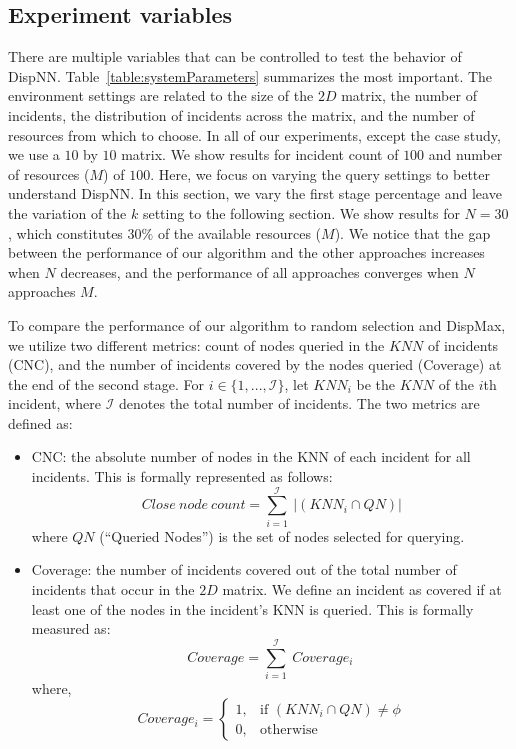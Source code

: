 \documentclass{acm_proc_article-sp}
\begin{document}
\subsection{Experiment variables}
There are multiple variables that can be controlled to test the behavior of DispNN. Table~\ref{table:systemParameters} summarizes the most important.
The environment settings are related to the size of the $2D$ matrix, the number of incidents, the distribution of incidents across the matrix, and the number of resources from which to choose. In all of our experiments, except the case study, we use a $10$ by $10$ matrix. We show results for incident count of $100$ and number of resources ($M$) of $100$. Here, we focus on varying the query settings to better understand DispNN. In this section, we vary the first stage percentage and leave the variation of the $k$ setting to the following section. We show results for $N = 30$, which constitutes $30\%$ of the available resources ($M$). We notice that the gap between the performance of our algorithm and the other approaches increases when $N$ decreases, and the performance of all approaches converges when $N$ approaches $M$. \par

To compare the performance of our algorithm to random selection and DispMax, we utilize two different metrics: count of nodes queried in the $KNN$ of incidents (CNC), and the number of incidents covered by the nodes queried (Coverage) at the end of the second stage. For $i \in \{1, ...,\mathcal{I}\}$, let $KNN_i$ be the $KNN$ of the $i$th incident, where $\mathcal{I}$ denotes the total number of incidents. The two metrics are defined as:
\begin{itemize}
\item CNC: the absolute number of nodes in the KNN of each incident for all incidents. This is formally represented as follows:
\begin{equation}
Close\ node\ count = \sum\limits_{ i = 1}^\mathcal{I}\ |(KNN_i \cap {QN})|
\end{equation}
where $QN$ (``Queried Nodes'') is the set of nodes selected for querying.
\item Coverage: the number of incidents covered out of the total number of incidents that occur in the $2D$ matrix. We define an incident as covered if at least one of the nodes in the incident's KNN is queried. This is formally measured as:
\begin{equation}
Coverage =  \sum\limits_{ i = 1}^\mathcal{I}\ Coverage_i\ 
\end{equation}
where,
\[
Coverage_i =
\begin{cases}
1,& \text{if }(KNN_i \cap {QN}) \neq \phi\\
0,              & \text{otherwise}
\end{cases}
\]
\end{itemize}
\end{document}
